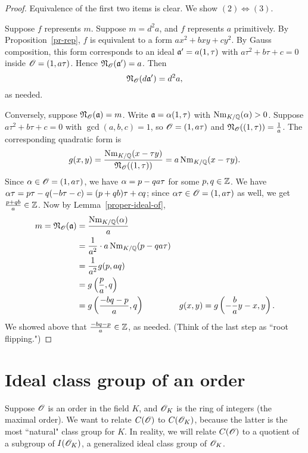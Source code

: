 \begin{proof}
Equivalence of the first two items is clear. We show $(2)\iff (3)$.

Suppose $f$ represents $m$. Suppose $m=d^2a$, and $f$ represents $a$ primitively. By Proposition~\ref{pr-rep}, $f$ is equivalent to a form $ax^2+bxy+cy^2$. By Gauss composition, this form corresponds to an ideal $\mathfrak{a}'=a(1,\tau)$ with $a\tau^2+b\tau+c=0$ inside $\mathscr{O}=(1,a\tau)$. %
Hence $\mathfrak{N}_{\mathscr{O}}(\mathfrak{a}')=a$. Then
\[
\mathfrak{N}_{\mathscr{O}}(d \mathfrak{a}')=d^2a,
\]
as needed.

Conversely, suppose $\mathfrak{N}_{\mathscr{O}}(\mathfrak{a})=m$. Write $\mathfrak{a}=\alpha(1,\tau)$ with $\operatorname{Nm}_{K/\mathbb{Q}}(\alpha)>0$. Suppose $a\tau^2+b\tau+c=0$ with $\gcd(a,b,c)=1$, so $\mathscr{O}=(1,a\tau)$ and %
$\mathfrak{N}_{\mathscr{O}}((1,\tau))=\frac{1}{a}$.
The corresponding quadratic form is
\[
g(x,y)=\frac{\operatorname{Nm}_{K/\mathbb{Q}}(x-\tau y)}{\mathfrak{N}_{\mathscr{O}}((1,\tau))}
=a\operatorname{Nm}_{K/\mathbb{Q}}(x-\tau y).
\]
Since $\alpha\in \mathscr{O}=(1,a\tau)$, we have $\alpha=p-qa\tau$ for some $p,q\in \mathbb{Z}$. We have $\alpha\tau = p\tau -q(-b\tau-c)=(p+qb)\tau+cq$; since $\alpha\tau\in \mathscr{O}=(1,a\tau)$ as well, we get $\frac{p+qb}{a}\in \mathbb{Z}$. Now by Lemma~\ref{proper-ideal-of},
\begin{align*}
m=
\mathfrak{N}_{\mathscr{O}}(\mathfrak{a})&=\frac{\operatorname{Nm}_{K/\mathbb{Q}}(\alpha)}{a}\\
&=\frac{1}{a^2}\cdot a \operatorname{Nm}_{K/\mathbb{Q}}(p-qa\tau)\\
&=\frac{1}{a^2}g(p,aq)\\
&=g\left( {\frac{p}{a},q} \right)\\
&=g\left( {\frac{-bq-p}{a},q} \right)&g(x,y)=g\left( {-\frac{b}{a}y-x,y} \right).
\end{align*}
We showed above that $\frac{-bq-p}{a}\in \mathbb{Z}$, as needed. (Think of the last step as ``root flipping.")
\end{proof}
\section{Ideal class group of an order}
Suppose $\mathscr{O}$ is an order in the field $K$, and $\mathscr{O}_K$ is the ring of integers (the maximal order).
We want to relate $C(\mathscr{O})$ to $C(\mathscr{O}_K)$, because the latter is the most ``natural" class group for $K$. In reality, we will relate $C(\mathscr{O})$ to a quotient of a subgroup of $I(\mathscr{O}_K)$, a generalized ideal class group of $\mathscr{O}_K$. %

